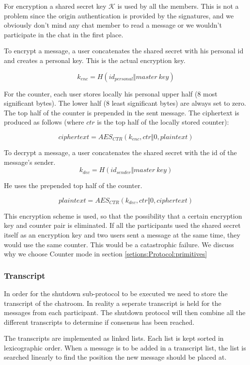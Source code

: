 For encryption a shared secret key $\mathcal{K}$ is used by all the members. This is not a problem since the origin authentication is provided by the signatures, and we obviously don't mind any chat member to read a message or we wouldn't participate in the chat in the first place.

To encrypt a message, a user concatenates the shared secret with his personal id and creates a personal key.
This is the actual encryption key.

\[
k_{enc} = H(id_{personal} \Vert master\ key)
\]

For the counter, each user stores locally his personal upper half (8 most significant bytes).
The lower half (8 least significant bytes) are always set to zero.
The top half of the counter is prepended in the sent message.
The ciphertext is produced as follows (where $ctr$ is the top half of the locally stored counter):

\[
ciphertext = AES_{CTR}(k_{enc}, ctr \Vert 0, plaintext)
\]

To decrypt a message, a user concatenates the shared secret with the id of the message's sender.
\[
k_{dec} = H(id_{sender} \Vert master\ key)
\]

He uses the prepended top half of the counter.

\[
plaintext = AES_{CTR}(k_{dec}, ctr \Vert 0, ciphertext)
\]

This encryption scheme is used, so that the possibility that a certain encryption key and counter pair is eliminated.
If all the participants used the shared secret itself as an encryption key and two users sent a message at the same time, they would use the same counter.
This would be a catastrophic failure.
We discuss why we choose Counter mode in section \ref{setions:Protocol:primitives}

\subsubsection{Transcript}
In order for the shutdown sub-protocol to be executed we need to store the transcript of the chatroom. In reality a seperate transcript is held for the messages from each participant.
The shutdown protocol will then combine all the different transcripts to determine if consensus has been reached.

The transcripts are implemented as linked lists. Each list is kept sorted in lexicographic order.
When a message is to be added in a transcript list, the list is searched linearly to find the position the new message should be placed at.


